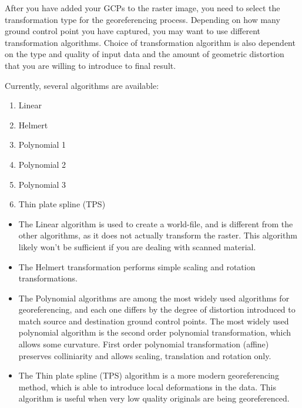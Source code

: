 After you have added your GCPs to the raster image, you need to select the transformation type for the georeferencing process. Depending on how many ground control point you have captured, you may want to use different transformation algorithms. Choice of transformation algorithm is also dependent on the type and quality of input data and the amount of geometric distortion that you are willing to introduce to final result.

Currently, several algorithms are available:

\begin{enumerate}
\item Linear
\item Helmert
\item Polynomial 1
\item Polynomial 2
\item Polynomial 3
\item Thin plate spline (TPS)
\end{enumerate}

\begin{itemize}
\item The Linear algorithm is used to create a world-file, and is different from the other algorithms, as it does not actually transform the raster. This algorithm likely won't be sufficient if you are dealing with scanned material.
\item The Helmert transformation performs simple scaling and rotation transformations. 
\item The Polynomial algorithms are among the most widely used algorithms for georeferencing, and each one differs by the degree of distortion introduced to match source and destination ground control points. The most widely used polynomial algorithm is the second order polynomial transformation, which allows some curvature. First order polynomial transformation (affine) preserves colliniarity and allows scaling, translation and rotation only.
\item The Thin plate spline (TPS) algorithm is a more modern georeferencing method, which is able to introduce local deformations in the data. This algorithm is useful when very low quality originals are being georeferenced.
\end{itemize}

\label{georeferencer_running}


